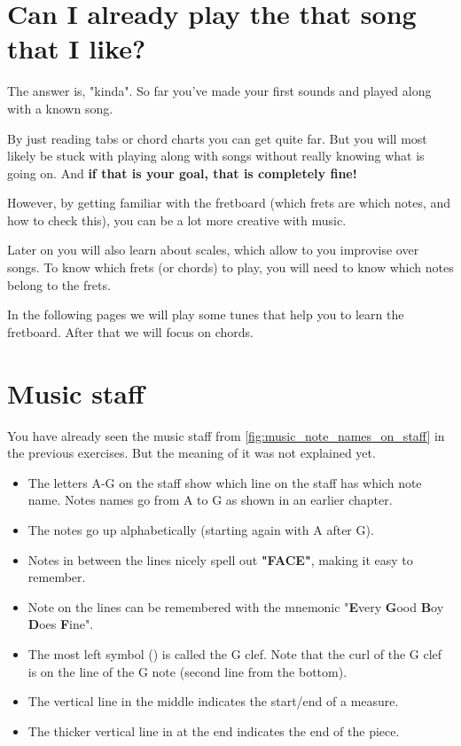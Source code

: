 \section{Can I already play the that song that I like?}

The answer is, "kinda". So far you've made your first sounds and played along with a known song.

By just reading tabs or chord charts you can get quite far. But you will most likely be stuck with playing along with songs without really knowing what is going on. And \textbf{if that is your goal, that is completely fine!}

However, by getting familiar with the fretboard (which frets are which notes, and how to check this), you can be a lot more creative with music.

Later on you will also learn about scales, which allow to you improvise over songs. To know which frets (or chords) to play, you will need to know which notes belong to the frets.

In the following pages we will play some tunes that help you to learn the fretboard. After that we will focus on chords.

\section{Music staff}

You have already seen the music staff from \autoref{fig:music_note_names_on_staff} in the previous exercises. But the meaning of it was not explained yet.

\begin{itemize}
	\item The letters A-G on the staff show which line on the staff has which note name. Notes names go from A to G as shown in an earlier chapter.
	\item The notes go up alphabetically (starting again with A after G). 
	\item Notes in between the lines nicely spell out \textbf{"FACE"}, making it easy to remember.
	\item Note on the lines can be remembered with the mnemonic "\textbf{E}very \textbf{G}ood \textbf{B}oy \textbf{D}oes \textbf{F}ine".
	\item The most left symbol (\clefG) is called the G clef. Note that the curl of the G clef is on the line of the G note (second line from the bottom). 
	\item The vertical line in the middle indicates the start/end of a measure.
	\item The thicker vertical line in at the end indicates the end of the piece.
\end{itemize}

